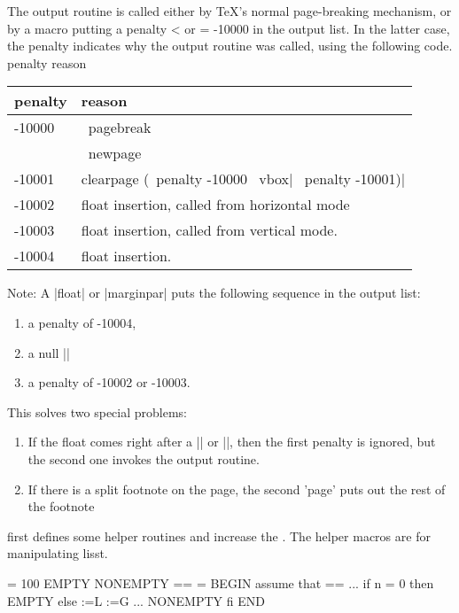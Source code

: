 The output routine is called either by TeX's normal page-breaking
mechanism, or by a macro putting a penalty < or = -10000 in the output
list. In the latter case, the penalty indicates why the output
routine was called, using the following code.
penalty reason

\begin{longtable}{ll}
\toprule
penalty &reason\\
\midrule
-10000  &\ pagebreak\\
~       &\ newpage\\
-10001  &clearpage (\ penalty -10000 \ vbox{}| \ penalty -10001)|\\
-10002  &float insertion, called from horizontal mode\\
-10003 &float insertion, called from vertical mode.\\
-10004 &float insertion.\\
\bottomrule
\end{longtable}
\medskip

Note: A |float| or |marginpar| puts the following sequence in the output
list: 

\begin{enumerate}
\item a penalty of -10004,

\item a null |\vbox|

\item a penalty of -10002 or -10003.
\end{enumerate}

This solves two special problems:

\begin{enumerate}
\item If the float comes right after a |\newpage| or |\clearpage|,
then the first penalty is ignored, but the second one
invokes the output routine.

\item If there is a split footnote on the page, the second 'page'
puts out the rest of the footnote
\end{enumerate}

\latex first defines some helper routines and increase the . The helper macros are for
manipulating lisst.

\begin{teX}
 \maxdeadcycles = 100
 \let\@elt\relax
 \def\@next#1#2#3#4{\ifx#2\@empty #4\else
   \expandafter\@xnext #2\@@#1#2#3\fi}
   \@next \CS \LIST {NONEMPTY}{EMPTY} == %
\@elt = \relax
 BEGIN assume that \LIST == \@elt {} ... \@elt \Bn
 if n = 0
 then EMPTY
 else 
   \CS :=L 
   \LIST :=G \@elt {} ... \@elt \Bn
   NONEMPTY
 fi
END
\end{teX}



